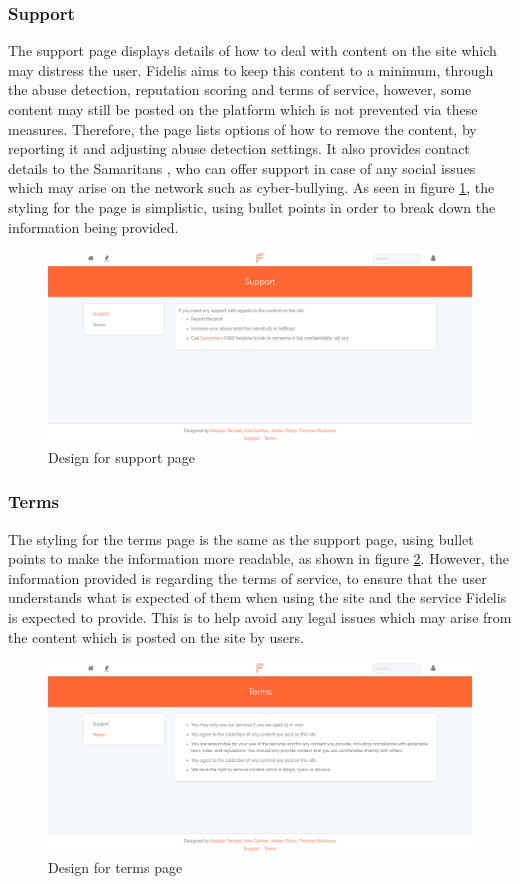 \subsubsection{Support}
The support page displays details of how to deal with content on the site which may distress the user. Fidelis aims to keep this content to a minimum, through the abuse detection, reputation scoring and terms of service, however, some content may still be posted on the platform which is not prevented via these measures. Therefore, the page lists options of how to remove the content, by reporting it and adjusting abuse detection settings. It also provides contact details to the Samaritans \cite{Samaritans:Home}, who can offer support in case of any social issues which may arise on the network such as cyber-bullying. As seen in figure \ref{fig:support}, the styling for the page is simplistic, using bullet points in order to break down the information being provided.

\begin{figure}[H]
\centering
\includegraphics[height=2in]{Images/Design/support-page}
\caption{Design for support page}
\label{fig:support}
\end{figure}

\subsubsection{Terms}
The styling for the terms page is the same as the support page, using bullet points to make the information more readable, as shown in figure \ref{fig:terms}. However, the information provided is regarding the terms of service, to ensure that the user understands what is expected of them when using the site and the service Fidelis is expected to provide. This is to help avoid any legal issues which may arise from the content which is posted on the site by users.

\begin{figure}[H]
\centering
\includegraphics[height=2in]{Images/Design/terms-page}
\caption{Design for terms page}
\label{fig:terms}
\end{figure}